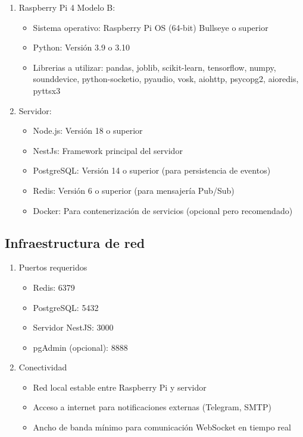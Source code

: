 \begin{enumerate}
  \item Raspberry Pi 4 Modelo B:
        \begin{itemize}
          \item Sistema operativo: Raspberry Pi OS (64-bit) Bullseye o superior
          \item Python: Versión 3.9 o 3.10
          \item Librerias a utilizar: pandas, joblib, scikit-learn, tensorflow, numpy, sounddevice, python-socketio, pyaudio, vosk, aiohttp, psycopg2, aioredis, pyttsx3
        \end{itemize}
  \item Servidor:
        \begin{itemize}
          \item Node.js: Versión 18 o superior
          \item NestJs: Framework principal del servidor
          \item PostgreSQL: Versión 14 o superior (para persistencia de eventos)
          \item Redis: Versión 6 o superior (para mensajería Pub/Sub)
          \item Docker: Para contenerización de servicios (opcional pero recomendado)
        \end{itemize}
\end{enumerate}

\subsection*{Infraestructura de red}

\begin{enumerate}
  \item Puertos requeridos
        \begin{itemize}
          \item Redis: 6379
          \item PostgreSQL: 5432
          \item Servidor NestJS: 3000
          \item pgAdmin (opcional): 8888
        \end{itemize}
  \item Conectividad
        \begin{itemize}
          \item Red local estable entre Raspberry Pi y servidor
          \item Acceso a internet para notificaciones externas (Telegram, SMTP)
          \item Ancho de banda mínimo para comunicación WebSocket en tiempo real
        \end{itemize}
\end{enumerate}

